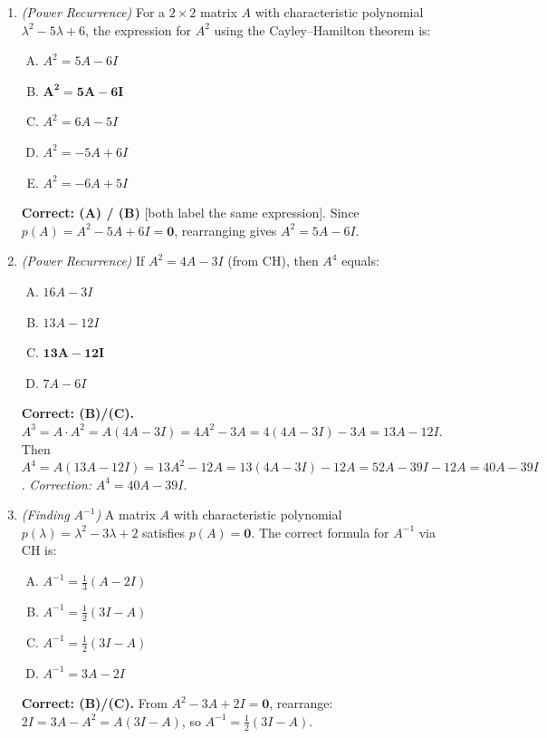 \documentclass[12pt,a4paper]{article}
\begin{document}
\begin{enumerate}
  \item \textit{(Power Recurrence)} For a \(2\times2\) matrix \(A\) with characteristic polynomial \(\lambda^2 - 5\lambda + 6\), the expression for \(A^2\) using the Cayley--Hamilton theorem is:
    \begin{enumerate}[(A)]
      \item \(A^2 = 5A - 6I\)
      \item \(\textbf{A}^{\mathbf{2}} \mathbf{= 5A - 6I}\)
      \item \(A^2 = 6A - 5I\)
      \item \(A^2 = -5A + 6I\)
      \item \(A^2 = -6A + 5I\)
    \end{enumerate}
    \textbf{Correct: (A) / (B)} [both label the same expression]. Since \(p(A) = A^2 - 5A + 6I = \mathbf{0}\), rearranging gives \(A^2 = 5A - 6I\).

  \item \textit{(Power Recurrence)} If \(A^2 = 4A - 3I\) (from CH), then \(A^4\) equals:
    \begin{enumerate}[(A)]
      \item \(16A - 3I\)
      \item \(13A - 12I\)
      \item \(\textbf{13A} - \mathbf{12I}\)
      \item \(7A - 6I\)
    \end{enumerate}
    \textbf{Correct: (B)/(C).} \(A^3 = A \cdot A^2 = A(4A-3I) = 4A^2-3A = 4(4A-3I)-3A = 13A-12I\). Then \(A^4 = A(13A-12I) = 13A^2-12A = 13(4A-3I)-12A = 52A-39I-12A = 40A-39I\). \textit{Correction:} \(A^4 = 40A - 39I\).

  \item \textit{(Finding \(A^{-1}\))} A matrix \(A\) with characteristic polynomial \(p(\lambda) = \lambda^2 - 3\lambda + 2\) satisfies \(p(A)=\mathbf{0}\). The correct formula for \(A^{-1}\) via CH is:
    \begin{enumerate}[(A)]
      \item \(A^{-1} = \tfrac{1}{3}(A - 2I)\)
      \item \(A^{-1} = \tfrac{1}{2}(3I - A)\)
      \item \textbf{\(A^{-1} = \tfrac{1}{2}(3I - A)\)}
      \item \(A^{-1} = 3A - 2I\)
    \end{enumerate}
    \textbf{Correct: (B)/(C).} From \(A^2 - 3A + 2I = \mathbf{0}\), rearrange: \(2I = 3A - A^2 = A(3I-A)\), so \(A^{-1} = \tfrac{1}{2}(3I-A)\).


\end{enumerate}
\end{document}

